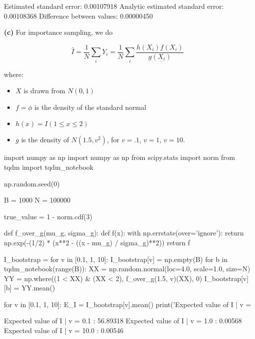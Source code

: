 \begin{console}
Estimated standard error:                0.00107918
Analytic estimated standard error:       0.00108368
Difference between values:               0.00000450
    \end{console}

\textbf{(c)} For importance sampling, we do

\[ \hat{I} = \frac{1}{N} \sum_{i} Y_{i} = \frac{1}{N} \sum_{i} \frac{h(X_{i}) f(X_{i})}{g(X_{i})} \]

where:

\begin{itemize}[tightlist]
\item
  \(X\) is drawn from \(N(0, 1)\)
\item
  \(f = \phi\) is the density of the standard normal
\item
  \(h(x) = I(1 \leq x \leq 2)\)
\item
  \(g\) is the density of \(N(1.5, v^{2})\), for \(v = .1\), \(v = 1\),
  \(v = 10\).
\end{itemize}

\begin{python}
import numpy as np
import numpy as np
from scipy.stats import norm
from tqdm import tqdm_{n}otebook

np.random.seed(0)

B = 1000
N = 100000

true_value = 1 - norm.cdf(3)

def f_over_g(mu_g, sigma_g):
    def f(x):
        with np.errstate(over='ignore'):
            return np.exp(-(1/2) * (x**2 - ((x - mu_g) / sigma_g)**2))
    return f

I_bootstrap = {}
for v in [0.1, 1, 10]:    
    I_bootstrap[v] = np.empty(B)
    for b in tqdm_{n}otebook(range(B)):
        XX = np.random.normal(loc=4.0, scale=1.0, size=N)
        YY = np.where((1 < XX) & (XX < 2), f_over_g(1.5, v)(XX), 0)
        I_bootstrap[v][b] = YY.mean()
\end{python}

\begin{python}
for v in [0.1, 1, 10]:
    E_I = I_bootstrap[v].mean()
    print('Expected value of I | v = %
\end{python}

\begin{console}
Expected value of I | v = 0.1 :          56.89318
Expected value of I | v = 1.0 :          0.00568
Expected value of I | v = 10.0 :         0.00546
\end{console}

